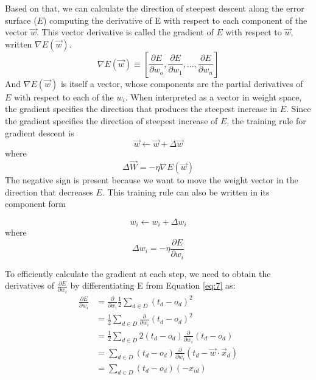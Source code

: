 \documentclass{tufte-handout}
\begin{document}
Based on that, we can calculate the direction of steepest descent along the error surface ($E$) computing the derivative of E with respect to each component of the vector $\Vec{w}$. This vector derivative is called the gradient of $E$ with respect to $\Vec{w}$, written $\nabla E(\Vec{w})$.
\begin{equation}
    \nabla E(\Vec{w}) \equiv 
    \left[ \frac{\partial E}{\partial w_o}, \frac{\partial E}{\partial w_1}, ..., \frac{\partial E}{\partial w_n} \right]
\end{equation}
And $\nabla E(\Vec{w})$ is itself a vector, whose components are the partial derivatives of $E$ with respect to each of the $w_i$. When interpreted as a vector in weight space, the gradient specifies the direction that produces the steepest increase in $E$.
Since the gradient specifies the direction of steepest increase of $E$, the training rule for gradient descent is 
\begin{equation}
    \Vec{w} \leftarrow \Vec{w} + \Delta \Vec{w}
\end{equation}
where
\begin{equation}
    \Delta \Vec{W} = - \eta \nabla E(\Vec{w})
\end{equation}
The negative sign is present because we want to move the weight vector in the direction that decreases $E$. This training rule can also be written in its component form

\begin{equation}
    w_i \leftarrow w_i + \Delta w_i
\end{equation}
where
\begin{equation}
    \Delta w_i = -\eta\frac{\partial E}{\partial w_i}
\end{equation}

To efficiently calculate the gradient at each step, we need to obtain the derivatives of $\frac{\partial E}{\partial w_i}$ by differentiating E from Equation \ref{eq:7} as:
\begin{equation}
    \begin{split}
        \frac{\partial E}{\partial w_i} &= \frac{\partial}{\partial w_i} \frac{1}{2} \sum_{d \in D} (t_d - o_d)^2 \\
        &= \frac{1}{2} \sum_{d \in D} \frac{\partial}{\partial w_i} (t_d - o_d)^2 \\
        &= \frac{1}{2} \sum_{d \in D} 2 (t_d - o_d) \frac{\partial}{\partial w_i} (t_d - o_d) \\
        &= \sum_{d \in D} (t_d - o_d) \frac{\partial}{\partial w_i} (t_d - \vec{w} \cdot \vec{x}_d) \\
        &= \sum_{d \in D} (t_d - o_d)(-x_{id})
    \end{split}
\end{equation}
\end{document}
